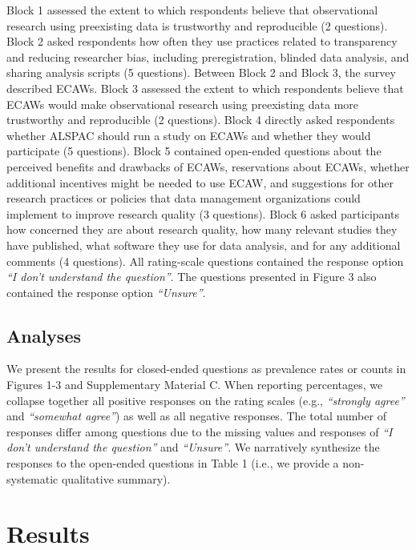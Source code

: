 \documentclass[
  man,floatsintext]{apa6}
\begin{document}
Block 1 assessed the extent to which respondents believe that observational research using preexisting data is trustworthy and reproducible (2 questions). Block 2 asked respondents how often they use practices related to transparency and reducing researcher bias, including preregistration, blinded data analysis, and sharing analysis scripts (5 questions). Between Block 2 and Block 3, the survey described ECAWs. Block 3 assessed the extent to which respondents believe that ECAWs would make observational research using preexisting data more trustworthy and reproducible (2 questions). Block 4 directly asked respondents whether ALSPAC should run a study on ECAWs and whether they would participate (5 questions). Block 5 contained open-ended questions about the perceived benefits and drawbacks of ECAWs, reservations about ECAWs, whether additional incentives might be needed to use ECAW, and suggestions for other research practices or policies that data management organizations could implement to improve research quality (3 questions). Block 6 asked participants how concerned they are about research quality, how many relevant studies they have published, what software they use for data analysis, and for any additional comments (4 questions). All rating-scale questions contained the response option \emph{``I don't understand the question''}. The questions presented in Figure 3 also contained the response option \emph{``Unsure''}.

\hypertarget{analyses}{%
\subsection{Analyses}\label{analyses}}

We present the results for closed-ended questions as prevalence rates or counts in Figures 1-3 and Supplementary Material C. When reporting percentages, we collapse together all positive responses on the rating scales (e.g., \emph{``strongly agree''} and \emph{``somewhat agree''}) as well as all negative responses. The total number of responses differ among questions due to the missing values and responses of \emph{``I don't understand the question''} and \emph{``Unsure''}. We narratively synthesize the responses to the open-ended questions in Table 1 (i.e., we provide a non-systematic qualitative summary).

\hypertarget{results}{%
\section{Results}\label{results}}
\end{document}
